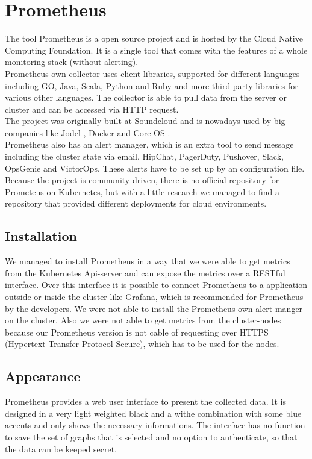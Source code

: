 \section{Prometheus}
\label{Prometheus} %
The tool Prometheus is a open source project and is hosted by the Cloud Native Computing Foundation.
It is a single tool that comes with the features of a whole monitoring stack (without alerting).\\ Prometheus own collector uses client libraries, supported for different languages including GO, Java, Scala, Python and Ruby and more third-party libraries for various other languages. The collector is able to pull data from the server or cluster and can be accessed via HTTP request.\\
The project was originally built at Soundcloud \cite{soundcloud} and  is nowadays used by big companies like Jodel \cite{jodel}, Docker and Core OS \cite{prometeus}. \\
Prometheus also has an alert manager, which is an extra tool to send message including the cluster state via email, HipChat, PagerDuty, Pushover, Slack, OpsGenie and VictorOps. These alerts have to be set up by an configuration file. \\
Because the project is community driven, there is no official repository for Prometeus on Kubernetes, but with a little research we managed to find a repository \cite{prometheus_kube} that provided different deployments for cloud environments.

\subsection{Installation}
We managed to install Prometheus in a way that we were able to get metrics from the  Kubernetes Api-server and can expose the metrics over a RESTful interface. Over this interface it is possible to connect Prometheus to a application outside or inside the cluster like Grafana, which is recommended for Prometheus by the developers. We were not able to install the Prometheus own alert manger on the cluster. Also we were not able to get metrics from the cluster-nodes because our Prometheus version is not cable of requesting over HTTPS (Hypertext Transfer Protocol Secure), which has to be used for the nodes. 
\subsection{Appearance}%
Prometheus provides a web user interface to present the collected data. It is designed in a very light weighted black and a withe combination with some blue accents and only shows the necessary informations. The interface has no function to save the set of graphs that is selected and no option to authenticate, so that the data can be keeped secret. 
